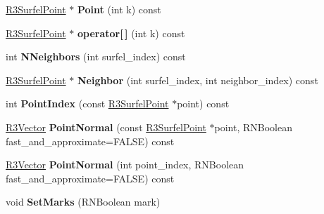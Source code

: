\begin{DoxyCompactItemize}
\item 
\hyperlink{class_r3_surfel_point}{R3\+Surfel\+Point} $\ast$ {\bfseries Point} (int k) const \hypertarget{class_r3_surfel_point_graph_a848b79d5f3a7876f0f34e7a000e2aa1e}{}\label{class_r3_surfel_point_graph_a848b79d5f3a7876f0f34e7a000e2aa1e}

\item 
\hyperlink{class_r3_surfel_point}{R3\+Surfel\+Point} $\ast$ {\bfseries operator\mbox{[}$\,$\mbox{]}} (int k) const \hypertarget{class_r3_surfel_point_graph_a217e226166421fbc0a489f0b78fad694}{}\label{class_r3_surfel_point_graph_a217e226166421fbc0a489f0b78fad694}

\item 
int {\bfseries N\+Neighbors} (int surfel\+\_\+index) const \hypertarget{class_r3_surfel_point_graph_ace9965d96f7771ab46f197f5237af7a5}{}\label{class_r3_surfel_point_graph_ace9965d96f7771ab46f197f5237af7a5}

\item 
\hyperlink{class_r3_surfel_point}{R3\+Surfel\+Point} $\ast$ {\bfseries Neighbor} (int surfel\+\_\+index, int neighbor\+\_\+index) const \hypertarget{class_r3_surfel_point_graph_a0da3982a56e64a25dcd3865ff85d7b1f}{}\label{class_r3_surfel_point_graph_a0da3982a56e64a25dcd3865ff85d7b1f}

\item 
int {\bfseries Point\+Index} (const \hyperlink{class_r3_surfel_point}{R3\+Surfel\+Point} $\ast$point) const \hypertarget{class_r3_surfel_point_graph_a134fc6741162e804e7eab17d76e27db8}{}\label{class_r3_surfel_point_graph_a134fc6741162e804e7eab17d76e27db8}

\item 
\hyperlink{class_r3_vector}{R3\+Vector} {\bfseries Point\+Normal} (const \hyperlink{class_r3_surfel_point}{R3\+Surfel\+Point} $\ast$point, R\+N\+Boolean fast\+\_\+and\+\_\+approximate=F\+A\+L\+SE) const \hypertarget{class_r3_surfel_point_graph_ab2831049499e488fa2723e35b420753d}{}\label{class_r3_surfel_point_graph_ab2831049499e488fa2723e35b420753d}

\item 
\hyperlink{class_r3_vector}{R3\+Vector} {\bfseries Point\+Normal} (int point\+\_\+index, R\+N\+Boolean fast\+\_\+and\+\_\+approximate=F\+A\+L\+SE) const \hypertarget{class_r3_surfel_point_graph_a977123db921465b265cc2209cd60ad7f}{}\label{class_r3_surfel_point_graph_a977123db921465b265cc2209cd60ad7f}

\item 
void {\bfseries Set\+Marks} (R\+N\+Boolean mark)\hypertarget{class_r3_surfel_point_graph_aa2f62a27df36042a75f0859605bf45d7}{}\label{class_r3_surfel_point_graph_aa2f62a27df36042a75f0859605bf45d7}


\end{DoxyCompactItemize}
